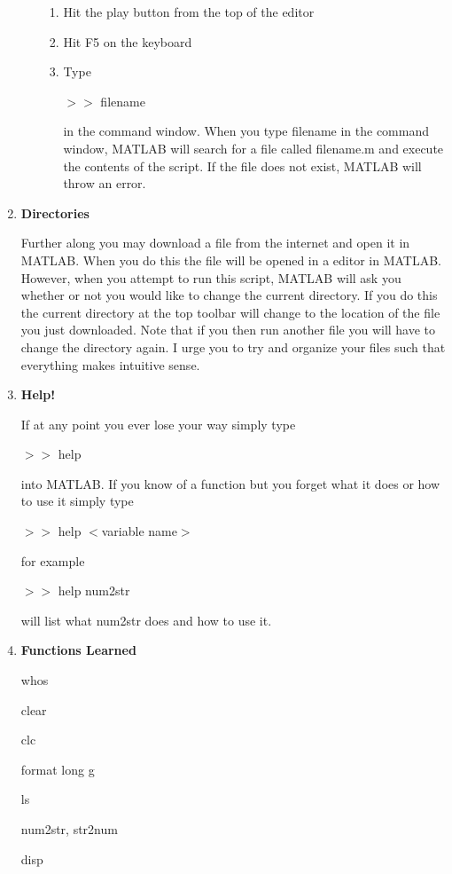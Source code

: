 \begin{enumerate}
\begin{enumerate}
\begin{enumerate}
\item Hit the play button from the top of the editor
\item Hit F5 on the keyboard
\item Type 

$>>$ filename 

in the command window. When you type filename in the command window,
MATLAB will search for a file called filename.m and execute the
contents of the script. If the file does not exist, MATLAB will throw
an error.

\end{enumerate}

\end{enumerate}

\item \textbf{Directories}

Further along you may download a file from the internet and open it in
MATLAB. When you do this the file will be opened in a editor in
MATLAB. However, when you attempt to run this script, MATLAB will ask
you whether or not you would like to change the current directory. If
you do this the current directory at the top toolbar will change to
the location of the file you just downloaded. Note that if you then
run another file you will have to change the directory again. I urge
you to try and organize your files such that everything makes
intuitive sense.

\item \textbf{Help!}

If at any point you ever lose your way simply type 

$>>$ help 

into MATLAB. If you know of a function but you forget what it does or
how to use it simply type

$>>$ help $<$variable name$>$

for example

$>>$ help num2str

will list what num2str does and how to use it.

\item {\bf Functions Learned}

whos

clear

clc

format long g

ls

num2str, str2num

disp

\end{enumerate}


